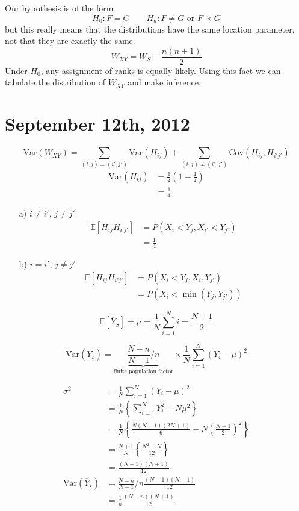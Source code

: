 \documentclass[a4paper,12pt]{amsart}
\newcommand{\Var}{\mbox{Var}}
\newcommand{\Cov}{\mbox{Cov}}
\newcommand{\E}[1]{\mathbb{E}\left[#1\right]}
\begin{document}
Our hypothesis is of the form
\[H_0: F = G \qquad H_a: F \neq G \mbox{ or } F \prec G\]
but this really means that the distributions have the same location parameter, not that they are exactly the same.
\[W_{XY} = W_S - \frac{n(n+1)}{2}\]
Under $H_0$, any assignment of ranks is equally likely. Using this fact we can tabulate the distribution of $W_{XY}$ and make inference.


\section{September 12th, 2012}
\[ \Var(W_{XY}) = \sum_{(i,j) = (i',j')} \Var(H_{ij}) + \sum_{(i,j) \neq (i',j')} \Cov(H_{ij},H_{i'j'})\]
\begin{align*}
\Var(H_{ij}) &= \frac{1}{2}\left(1 - \frac{1}{2}\right)\\
&= \frac{1}{4}
\end{align*}
\begin{enumerate}
\item[a)] $i \neq i'$, $j \neq j'$
\begin{align*}
\E{H_{ij}H_{i'j'}} &= P(X_i<Y_j,X_{i'}<Y_{j'})\\
&= \frac{1}{4}
\end{align*}
\item[b)] $i = i'$, $j \neq j'$
\begin{align*}
\E{H_{ij}H_{i'j'}} &= P(X_i<Y_j, X_i, Y_{j'})\\
&=P(X_i < \min(Y_j,Y_{j'}))
\end{align*}
\end{enumerate}

\[\E{\overline{Y}_S} = \mu = \frac{1}{N} \sum_{i=1}^N i = \frac{N+1}{2}\]

\[\Var(\overline{Y}_s) = \underbrace{\frac{N-n}{N-1}/n}_\text{finite population factor} \times \frac{1}{N}\sum_{i=1}^N (Y_i-\mu)^2\]

\begin{align*}
\sigma^2 &= \frac{1}{N}\sum_{i=1}^N (Y_i-\mu)^2\\
&= \frac{1}{N}\left\{ \sum_{i=1}^N Y_i^2 - N \mu^2 \right\}\\
&= \frac{1}{N}\left\{\frac{N(N+1)(2N+1)}{6} - N \left(\frac{N+1}{2}\right)^2\right\}\\
&= \frac{N+1}{N} \left\{\frac{N^2-N}{12} \right\}\\
&= \frac{(N-1)(N+1)}{12}\\
\Var(\overline{Y}_s) &= \frac{N-n}{N-1}/n \frac{(N-1)(N+1)}{12}\\
&= \frac{1}{n} \frac{(N-n)(N+1)}{12}
\end{align*}
\end{document}
